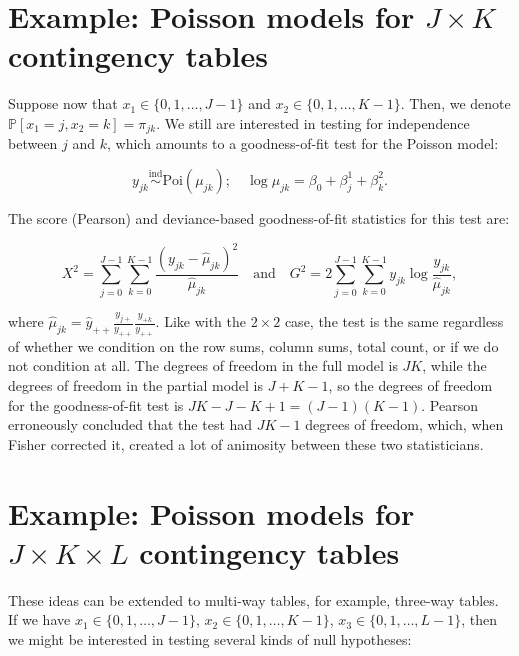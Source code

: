 \documentclass[
  11pt,
  letterpaper,
  oneside]{book}
\theoremstyle{plain}
\theoremstyle{plain}
\theoremstyle{definition}
\theoremstyle{definition}
\theoremstyle{plain}
\theoremstyle{remark}
\begin{document}
\hypertarget{sec-poisson-jk-tables}{%
\section{\texorpdfstring{Example: Poisson models for \(J \times K\)
contingency
tables}{Example: Poisson models for J \textbackslash times K contingency tables}}\label{sec-poisson-jk-tables}}

Suppose now that \(x_1 \in \{0, 1, \dots, J-1\}\) and
\(x_2 \in \{0, 1, \dots, K-1\}\). Then, we denote
\(\mathbb{P}[x_1 = j, x_2 = k] = \pi_{jk}\). We still are interested in
testing for independence between \(j\) and \(k\), which amounts to a
goodness-of-fit test for the Poisson model:

\[
y_{jk} \overset{\text{ind}}\sim \text{Poi}(\mu_{jk}); \quad \log \mu_{jk} = \beta_0 + \beta^1_j + \beta^2_k.
\]

The score (Pearson) and deviance-based goodness-of-fit statistics for
this test are:

\[
X^2 = \sum_{j = 0}^{J-1} \sum_{k = 0}^{K-1} \frac{(y_{jk} - \widehat \mu_{jk})^2}{\widehat \mu_{jk}} \quad \text{and} \quad G^2 = 2\sum_{j = 0}^{J-1} \sum_{k = 0}^{K-1} y_{jk}\log \frac{y_{jk}}{\widehat \mu_{jk}},
\]

where
\(\widehat \mu_{jk} = \widehat y_{++}\frac{y_{j+}}{y_{++}}\frac{y_{+k}}{y_{++}}\).
Like with the \(2 \times 2\) case, the test is the same regardless of
whether we condition on the row sums, column sums, total count, or if we
do not condition at all. The degrees of freedom in the full model is
\(JK\), while the degrees of freedom in the partial model is
\(J + K - 1\), so the degrees of freedom for the goodness-of-fit test is
\(JK - J - K + 1 = (J - 1)(K - 1)\). Pearson erroneously concluded that
the test had \(JK - 1\) degrees of freedom, which, when Fisher corrected
it, created a lot of animosity between these two statisticians.

\hypertarget{sec-poisson-jkl-tables}{%
\section{\texorpdfstring{Example: Poisson models for
\(J \times K \times L\) contingency
tables}{Example: Poisson models for J \textbackslash times K \textbackslash times L contingency tables}}\label{sec-poisson-jkl-tables}}

These ideas can be extended to multi-way tables, for example, three-way
tables. If we have \(x_1 \in \{0, 1, \dots, J-1\}\),
\(x_2 \in \{0, 1, \dots, K-1\}\), \(x_3 \in \{0, 1, \dots, L-1\}\), then
we might be interested in testing several kinds of null hypotheses:
\end{document}
